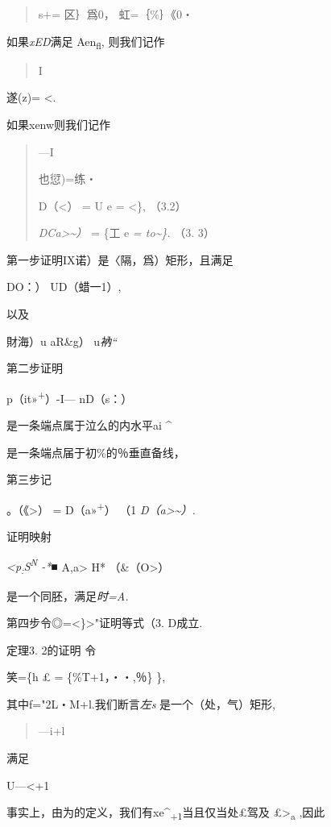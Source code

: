 \documentclass{article}
\begin{document}
\begin{quote}
s+= 区｝爲0， 虹=｛\%｝《0・
\end{quote}

如果\emph{xED}满足 Aen\textsubscript{fl}, 则我们记作

\begin{quote}
I
\end{quote}

遂(z)= \textless{}.

如果xenw则我们记作

\begin{quote}
---I

也愆)=练・

D（\textless{}） = U e = \textless{}\}, （3.2）

\emph{DCa\textgreater{}\textasciitilde{}）} = \{工 e \emph{=
to\textasciitilde{}\}.} （3. 3）
\end{quote}

第一步证明IX诺）是〈隔，爲）矩形，且满足

DO：） UD（蜡一1）,

以及

財海）u aR\&g） u\emph{衲``}

第二步证明

p（it»\textsuperscript{+}）-I--- nD（s：）

是一条端点属于泣么的内水平ai \^{}

是一条端点届于初\%的％垂直备线，

第三步记

。（《\textgreater{}） = D（a»\textsuperscript{+}） （1
\emph{D（a\textgreater{}\textasciitilde{}）.}

证明映射

\emph{\textless{}p\textsubscript{:}S\textsuperscript{N} -*■}
A,a\textgreater{} H* （\&（O\textgreater{}）

是一个同胚，满足\emph{时=A.}

第四步令◎=\textless{}\}\textgreater{}"证明等式（3. D成立.

定理3. 2的证明 令

笑=\{h £ = \{\%T+1，・・,％\} \},

其中f="2L・M+l.我们断言\emph{左s} 是一个（处，气）矩形,

\begin{quote}
---i+l
\end{quote}

满足

U---\textless{}+1

事实上，由为的定义，我们有xe\^{}\textsubscript{+1}当且仅当处£驾及
£\textgreater{}\textsubscript{a} ,因此
\end{document}
